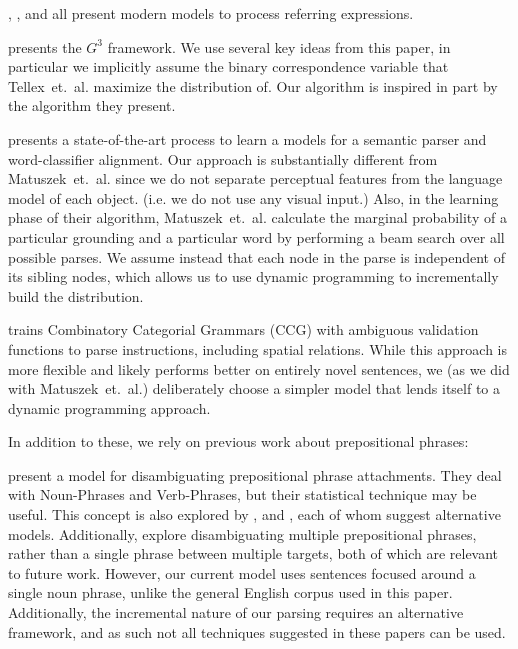 \documentclass[letterpaper,10pt]{article}
\begin{document}
\citet{tellex2011understanding}, \citet{UW_RSE_ICML2012}, and \citet{artzi2013weakly} all present modern models to process referring expressions.

\citet{tellex2011understanding} presents the $G^3$ framework. We use several key ideas from this paper, in particular we implicitly assume the binary correspondence variable that Tellex~et.~al. maximize the distribution of. Our algorithm is inspired in part by the algorithm they present.

\citet{UW_RSE_ICML2012} presents a state-of-the-art process to learn a models for a semantic parser and word-classifier alignment. Our approach is substantially different from Matuszek~et.~al. since we do not separate perceptual features from the language model of each object. (i.e. we do not use any visual input.) Also, in the learning phase of their algorithm, Matuszek~et.~al. calculate the marginal probability of a particular grounding and a particular word by performing a beam search over all possible parses. We assume instead that each node in the parse is independent of its sibling nodes, which allows us to use dynamic programming to incrementally build the distribution.

\citet{artzi2013weakly} trains Combinatory Categorial Grammars (CCG) with ambiguous validation functions to parse instructions, including spatial relations. While this approach is more flexible and likely performs better on entirely novel sentences, we (as we did with Matuszek~et.~al.) deliberately choose a simpler model that lends itself to a dynamic programming approach.


In addition to these, we rely on previous work about prepositional phrases:

\citet{collins95} present a model for disambiguating prepositional phrase attachments. They deal with Noun-Phrases and Verb-Phrases, but their statistical technique may be useful. This concept is also explored by \citet{ratna98}, and \citet{brill94}, each of whom suggest alternative models. Additionally, \citet{merlo97} explore disambiguating multiple prepositional phrases, rather than a single phrase between multiple targets, both of which are relevant to future work. However, our current model uses sentences focused around a single noun phrase, unlike the general English corpus used in this paper. Additionally, the incremental nature of our parsing requires an alternative framework, and as such not all techniques suggested in these papers can be used.
\end{document}
